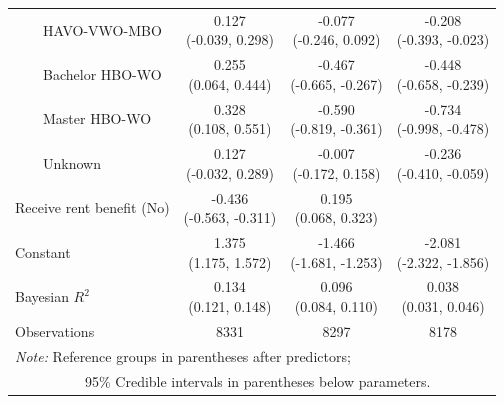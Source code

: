 \documentclass[12pt]{article}
\begin{document}
\begin{appendices}
\begin{longtable}{lccc}
    ~~~~HAVO-VWO-MBO & \makecell{ 0.127 \\ [-1ex] (-0.039, 0.298) }
    	& \makecell{ -0.077 \\ [-1ex] (-0.246, 0.092) }
    	& \makecell{ -0.208 \\ [-1ex] (-0.393, -0.023) } \\ 
    ~~~~Bachelor HBO-WO & \makecell{ 0.255 \\ [-1ex] (0.064, 0.444) }
    	& \makecell{ -0.467 \\ [-1ex] (-0.665, -0.267) }
    	& \makecell{ -0.448 \\ [-1ex] (-0.658, -0.239) } \\ 
    ~~~~Master HBO-WO & \makecell{ 0.328 \\ [-1ex] (0.108, 0.551) }
    	& \makecell{ -0.590 \\ [-1ex] (-0.819, -0.361) }
    	& \makecell{ -0.734 \\ [-1ex] (-0.998, -0.478) } \\ 
    ~~~~Unknown & \makecell{ 0.127 \\ [-1ex] (-0.032, 0.289) }
    	& \makecell{ -0.007 \\ [-1ex] (-0.172, 0.158) }
    	& \makecell{ -0.236 \\ [-1ex] (-0.410, -0.059) } \\ 
    Receive rent benefit (No) & \makecell{ -0.436 \\ [-1ex] (-0.563, -0.311) }
                              & \makecell{ 0.195 \\ [-1ex] (0.068, 0.323) }
                              &  \\ 
    Constant & \makecell{ 1.375 \\ [-1ex] (1.175, 1.572) }
    	     & \makecell{ -1.466 \\ [-1ex] (-1.681, -1.253) }
    	     & \makecell{ -2.081 \\ [-1ex] (-2.322, -1.856) } \\ 
    \hline\hline
    Bayesian $R^2$
        & \makecell{ 0.134 \\ [-1ex] (0.121, 0.148) } 
        & \makecell{ 0.096 \\ [-1ex] (0.084, 0.110) }
        & \makecell{ 0.038 \\ [-1ex] (0.031, 0.046) }
        \\
    Observations & 8331 & 8297 & 8178 \\ 
    \hline
    \multicolumn{4}{l}{\textit{Note:} Reference groups in parentheses after predictors;} \\
    \multicolumn{4}{l}{~~~~~~~~~~95\% Credible intervals in parentheses below parameters.}
    \label{tbl-survey-variable-models}
\end{longtable}



\end{appendices}
\end{document}
